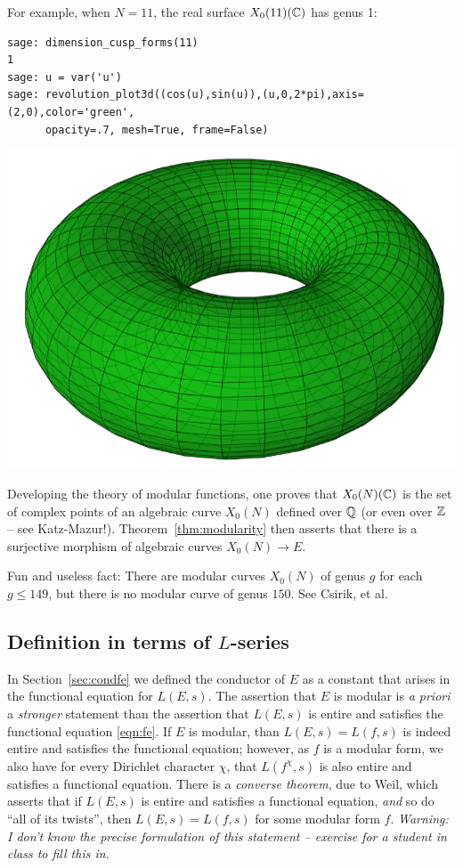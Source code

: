 \documentclass{book}
\begin{document}
For example, when $N=11$, the real surface $X_0(11)(\mathbb{C})$ has genus 1:
\begin{lstlisting}
sage: dimension_cusp_forms(11)
1
sage: u = var('u')
sage: revolution_plot3d((cos(u),sin(u)),(u,0,2*pi),axis=(2,0),color='green',
      opacity=.7, mesh=True, frame=False)
\end{lstlisting}
\begin{center}
\includegraphics[width=.7\textwidth]{pics/torus}
\end{center}


Developing the theory of modular functions, one proves that
$X_0(N)(\mathbb{C})$ is the set of complex points of an algebraic curve
$X_0(N)$ defined over $\mathbb{Q}$ (or even over $\mathbb{Z}$ -- see Katz-Mazur!).
Theorem~\ref{thm:modularity} then asserts that there is a surjective
morphism of algebraic curves $X_0(N)\to E$.

\begin{remark}
Fun and useless fact:
There are modular curves $X_0(N)$ of genus $g$ for each $g\leq 149$,
but there is no modular curve of genus $150$.  See Csirik, et al.
\end{remark}

\subsection{Definition in terms of $L$-series}

In Section~\ref{sec:condfe} we defined the conductor of $E$
as a constant that arises in the functional equation
for $L(E,s)$.   The assertion that $E$ is modular is
{\em a priori} a {\em stronger} statement than the assertion
that $L(E,s)$ is entire and satisfies the functional
equation \eqref{eqn:fe}.  If $E$ is modular, than $L(E,s)=L(f,s)$
is indeed entire and satisfies the functional equation;
however, as $f$ is a modular form, we also have for
every Dirichlet character $\chi$,  that
$L(f^{\chi},s)$ is also entire and satisfies a functional
equation.  There is a {\em converse theorem}, due to Weil,
which asserts that if $L(E,s)$ is entire and satisfies
a functional equation, {\em and} so do ``all of its twists'', then
$L(E,s)=L(f,s)$ for some modular form $f$.
{\em Warning: I don't know the precise formulation
of this statement -- exercise for a student in class to fill
this in.}
\end{document}
